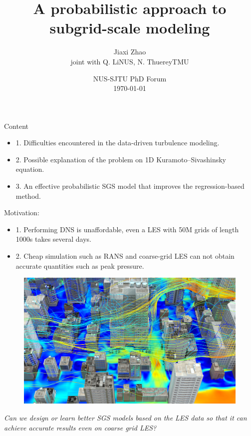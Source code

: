 \documentclass[paper slide]{beamer}
\title[Probabilistic SGS modeling]{A probabilistic approach to 
		subgrid-scale modeling}
\author[J. Zhao]{Jiaxi Zhao \\ \small joint with Q. Li\@ NUS, N. Thuerey\@ TMU}
\date[\today]{NUS-SJTU PhD Forum \\ \today}
\begin{document}
\par \setlength{\parindent}{2em}

\begin{frame}
\titlepage
\end{frame}


\begin{frame}{Content}
	\begin{itemize}
		\item 1. Difficulties encountered in the data-driven turbulence modeling.
		\item 2. Possible explanation of the problem on 1D Kuramoto–Sivashinsky
		equation.
		\item 3. An effective probabilistic SGS model that improves the
		regression-based method.
	\end{itemize}
\end{frame}


\begin{frame}{Motivation:}
	\begin{itemize}
		\item 1. Performing DNS is unaffordable, even a LES with 50M grids of length 1000s takes several days.
		\item 2. Cheap simulation such as RANS and coarse-grid LES can not obtain accurate quantities such as peak pressure.
	\end{itemize}
	\begin{figure}[ht]
		\centering
		\includegraphics[width=.6\linewidth]{fig/urban_environment.jpeg}
	\end{figure}
	\textit{Can we {\color{red}design or learn better SGS models} based on the LES data so that it can achieve accurate
	results even {\color{red}on coarse grid LES?}}
\end{frame}
\end{document}
